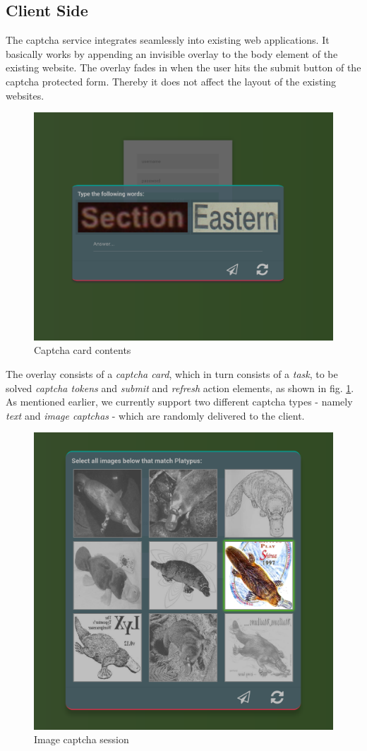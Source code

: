 \subsection{Client Side}
\label{subsec:Client Side}
The captcha service integrates seamlessly into existing web applications. It basically works by appending an invisible overlay to the body element of the existing website. The overlay fades in when the user hits the submit button of the captcha protected form. Thereby it does not affect the layout of the existing websites.
\begin{figure}[!h]
	\centering
	\includegraphics[width=0.7\linewidth]{content/figures/captcha_words.png}
	\caption{Captcha card contents}
	\label{fig:captcha_words}
\end{figure}

 The overlay consists of a \textit{captcha card}, which in turn consists of a \textit{task}, to be solved \textit{captcha tokens} and \textit{submit} and \textit{refresh} action elements, as shown in fig. \ref{fig:captcha_words}. As mentioned earlier, we currently support two different captcha types - namely \textit{text} and \textit{image captchas} - which are randomly delivered to the client. 
 
 \begin{figure}[!h]
	\centering
	\includegraphics[width=0.7\linewidth]{content/figures/captcha_images.png}
	\caption{Image captcha session}
	\label{fig:captcha_images}
\end{figure}
 
